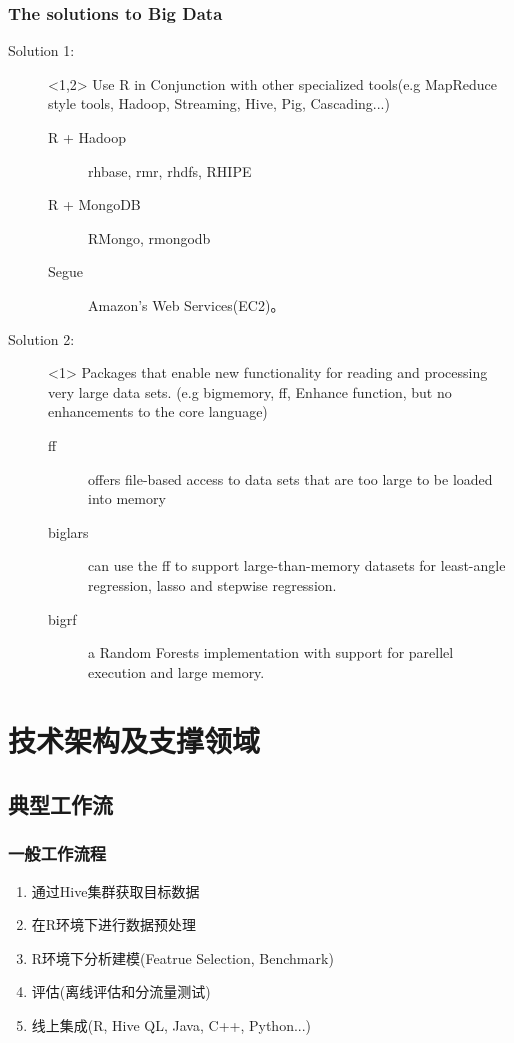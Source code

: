 \documentclass[UTF8,                %
               table,               %
               9pt,                %
               aspectratio=43]      %
               {beamer}
\begin{document}
\begin{frame}
  \frametitle{The solutions to Big Data}
  \begin{description}
    \item[Solution 1:]<1,2> Use R in Conjunction with other specialized tools(e.g MapReduce style tools, Hadoop, Streaming, Hive, Pig, Cascading...)
        \begin{description}
          \item[R + Hadoop] rhbase, rmr, rhdfs, RHIPE
          \item[R + MongoDB] RMongo, rmongodb
          \item[Segue] Amazon's Web Services(EC2)。
        \end{description}
    \item[Solution 2:]<1> Packages that enable new functionality for reading and processing very large data sets. (e.g bigmemory, ff, Enhance function, but no enhancements to the core language)
        \begin{description}
          \item[ff] offers file-based access to data sets that are too large to be loaded into memory
          \item[biglars] can use the ff to support large-than-memory datasets for least-angle regression, lasso and stepwise regression.
          \item[bigrf] a Random Forests implementation with support for parellel execution and large memory.
        \end{description}
  \end{description}
\end{frame}


\section{技术架构及支撑领域}

    \subsection{典型工作流}

\begin{frame}
  \frametitle{一般工作流程}
  \begin{enumerate}
    \item 通过Hive集群获取目标数据
    \item 在R环境下进行数据预处理
    \item R环境下分析建模(Featrue Selection, Benchmark)
    \item 评估(离线评估和分流量测试)
    \item 线上集成(R, Hive QL, Java, C++, Python...)
  \end{enumerate}
\end{frame}
\end{document}
